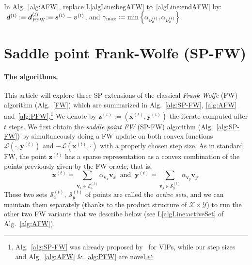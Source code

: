 \documentclass[twoside]{article}
\renewcommand{\L}{\mathcal{L}}
\newcommand{\X}{\mathcal{X}}
\newcommand{\Y}{\mathcal{Y}}
\newcommand{\x}{\bm{x}}
\newcommand{\y}{\bm{y}}
\newcommand{\z}{\bm{z}}
\newcommand{\s}{\bm{s}}
\newcommand{\xt}{\bm{x}^{(t)}}
\newcommand{\zt}{\bm{z}^{(t)}}
\newcommand{\yt}{\bm{y}^{(t)}}
\newcommand{\stepsize}{\gamma}
\newcommand{\stepmax}{\stepsize_{\textnormal{\scriptsize max}}} %
\newcommand{\PW}{{\hspace{0.05em}\textnormal{PFW}}}
\newcommand{\dd}{\bm{d}}
\newcommand{\vv}{\bm{v}} %
\newcommand{\Vertices}{\mathcal{A}\times \mathcal{B}} %
\newcommand{\Coreset}{\mathcal{S}}
\newcommand{\0}{\mathbf{0}} %
\begin{document}
\begin{figure*}[ttt]
\begin{minipage}[t]{\textwidth}
\begin{algorithm}[H]
\begin{algorithmic}[1]
  \ENDFOR
\end{algorithmic}
\end{algorithm}
~\vspace{-1.5mm}
\begin{algorithm}[H]
  \caption{Saddle point pairwise Frank-Wolfe algorithm: \textbf{SP-PFW}$(\z^{(0)}, \Vertices, \epsilon)$}\label{alg:PFW}
  \begin{algorithmic}[1]
  \STATE In Alg.~\ref{alg:AFW}, replace L\ref{algLine:begAFW} to~\ref{algLine:endAFW} by:  $\,\, \dd^{(t)} := \dd_{\PW}^{(t)} \!:= \s^{(t)} - \vv^{(t)}$, and $\stepmax := \min\left\{ \alpha_{\vv_x^{(t)}},\alpha_{\vv_x^{(t)}}\right\}$.
  \end{algorithmic}
\end{algorithm}
\end{minipage}
\vspace{-4mm}
\end{figure*}
\endgroup


\vspace{-0.3mm}
\section{Saddle point Frank-Wolfe (SP-FW)} \label{sec:algorithms}
\vspace{-2.4mm}
\paragraph{The algorithms.} %
\label{par:the_algorithms}
This article will explore three SP extensions of the classical {\em Frank-Wolfe} (FW) algorithm (Alg.~\ref{FW}) which are summarized in Alg.~\ref{alg:SP-FW}, \ref{alg:AFW} and~\ref{alg:PFW}.\footnote{Alg.~\ref{alg:SP-FW} was already proposed by~\citet{hammond1984solving} for VIPs, while our step sizes and Alg.~\ref{alg:AFW} \&~\ref{alg:PFW} are novel.}
We denote by $\zt := (\xt,\yt)$ the iterate computed after $t$ steps.
We first obtain the {\em saddle point FW} (SP-FW) algorithm (Alg.~\ref{alg:SP-FW}) by simultaneously doing a FW update on both convex functions $\L(\cdot,\yt)$ and  $-\L(\xt,\cdot)$ with a properly chosen step size. As in standard FW, the point $\zt$ has a sparse representation as a convex combination of the points previously given by the FW oracle, that is,
\begin{equation}  
\x^{(t)} = \sum_{\vv_x \in \Coreset_x^{(t)}} \alpha_{\vv_x} \vv_x \;\; \text{and}\;\; \y^{(t)} = \sum_{\vv_y \in \Coreset_y^{(t)}} \alpha_{\vv_y} \vv_y.
\end{equation}
These two sets $\Coreset_x^{(t)}$, $\Coreset_y^{(t)}$ of points are called the \emph{active sets}, and we can maintain them separately (thanks to the product structure of $\X \times \Y$) to run the other two FW variants that we describe below (see L\ref{algLine:activeSet} of Alg.~\ref{alg:AFW}).
\end{document}
